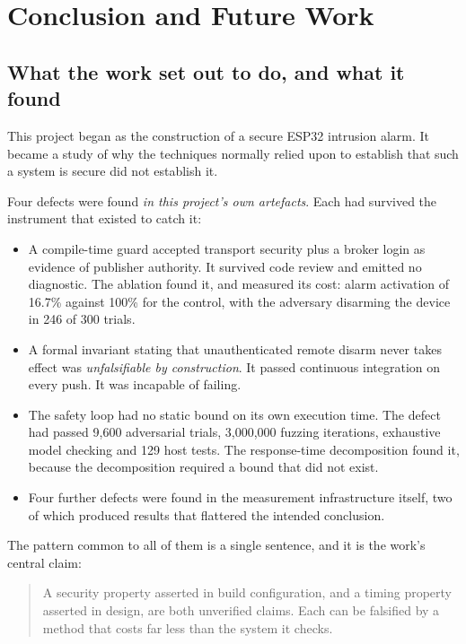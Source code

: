 \chapter{Conclusion and Future Work}\label{ch:conclusion}

\section{What the work set out to do, and what it found}

This project began as the construction of a secure ESP32 intrusion alarm. It became a study of
why the techniques normally relied upon to establish that such a system is secure did not
establish it.

Four defects were found \emph{in this project's own artefacts}. Each had survived the instrument
that existed to catch it:

\begin{itemize}[leftmargin=1.6em,itemsep=4pt]
  \item A compile-time guard accepted transport security plus a broker login as evidence of
        publisher authority. It survived code review and emitted no diagnostic. The ablation
        found it, and measured its cost: alarm activation of 16.7\% against 100\% for the
        control, with the adversary disarming the device in 246 of 300 trials.
  \item A formal invariant stating that unauthenticated remote disarm never takes effect was
        \emph{unfalsifiable by construction}. It passed continuous integration on every push.
        It was incapable of failing.
  \item The safety loop had no static bound on its own execution time. The defect had passed
        9,600 adversarial trials, 3,000,000 fuzzing iterations, exhaustive model checking and 129
        host tests. The response-time decomposition found it, because the decomposition required
        a bound that did not exist.
  \item Four further defects were found in the measurement infrastructure itself, two of which
        produced results that flattered the intended conclusion.
\end{itemize}

The pattern common to all of them is a single sentence, and it is the work's central claim:

\begin{quote}
A security property asserted in build configuration, and a timing property asserted in design,
are both unverified claims. Each can be falsified by a method that costs far less than the system
it checks.
\end{quote}

